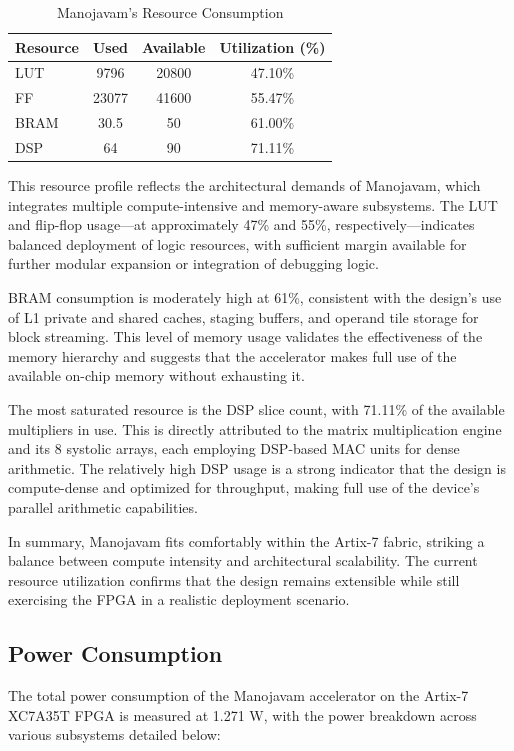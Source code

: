 \begin{table}[htb]
	\centering
	\fontsize{10}{12}\selectfont
	\caption{Manojavam's Resource Consumption}
	\label{tab:manojavam-resource-consumption}
	\begin{tabular}{|p{3cm}|c|c|c|}
		\hline
		\textbf{Resource}& \textbf {Used} & \textbf {Available} & \textbf{Utilization (\%)}\\
		\hline
		LUT & 9796 & 20800 & 47.10\%\\\hline
		FF & 23077 & 41600 & 55.47\%\\\hline
		BRAM & 30.5 & 50 & 61.00\%\\\hline
		DSP & 64 & 90 & 71.11\%\\\hline
	\end{tabular}
\end{table}

This resource profile reflects the architectural demands of Manojavam, which integrates multiple compute-intensive and memory-aware subsystems. The LUT and flip-flop usage—at approximately 47\% and 55\%, respectively—indicates balanced deployment of logic resources, with sufficient margin available for further modular expansion or integration of debugging logic.

BRAM consumption is moderately high at 61\%, consistent with the design’s use of L1 private and shared caches, staging buffers, and operand tile storage for block streaming. This level of memory usage validates the effectiveness of the memory hierarchy and suggests that the accelerator makes full use of the available on-chip memory without exhausting it.

The most saturated resource is the DSP slice count, with 71.11\% of the available multipliers in use. This is directly attributed to the matrix multiplication engine and its 8 systolic arrays, each employing DSP-based MAC units for dense arithmetic. The relatively high DSP usage is a strong indicator that the design is compute-dense and optimized for throughput, making full use of the device's parallel arithmetic capabilities.

In summary, Manojavam fits comfortably within the Artix-7 fabric, striking a balance between compute intensity and architectural scalability. The current resource utilization confirms that the design remains extensible while still exercising the FPGA in a realistic deployment scenario.

\subsection{Power Consumption}
The total power consumption of the Manojavam accelerator on the Artix-7 XC7A35T FPGA is measured at 1.271 W, with the power breakdown across various subsystems detailed below:

